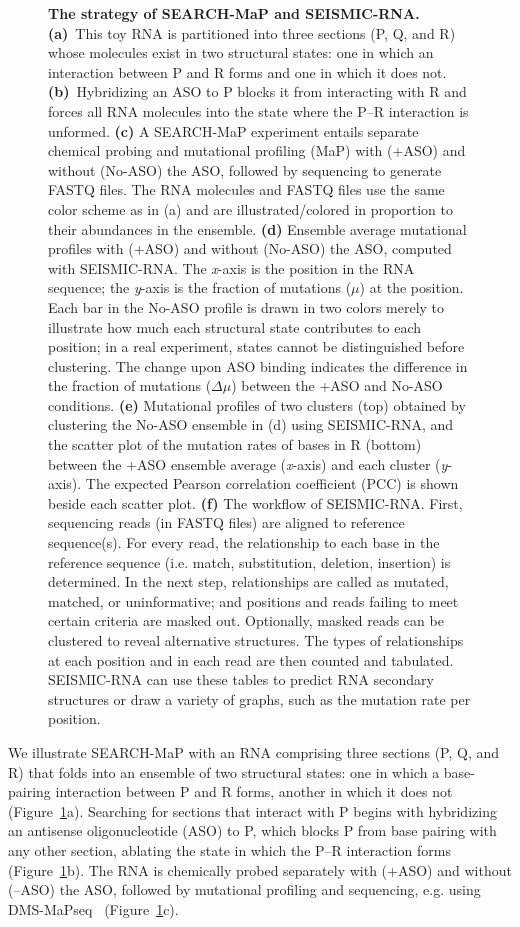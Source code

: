 \documentclass[main.tex]{subfiles}
\begin{document}
\begin{figure}[H]
	\caption{\textbf{The strategy of SEARCH-MaP and SEISMIC-RNA.} \textbf{(a)}~This toy RNA is partitioned into three sections (P, Q, and R) whose molecules exist in two structural states: one in which an interaction between P and R forms and one in which it does not. \textbf{(b)}~Hybridizing an ASO to P blocks it from interacting with R and forces all RNA molecules into the state where the P--R interaction is unformed. \textbf{(c)} A SEARCH-MaP experiment entails separate chemical probing and mutational profiling (MaP) with (+ASO) and without (No-ASO) the ASO, followed by sequencing to generate FASTQ files. The RNA molecules and FASTQ files use the same color scheme as in (a) and are illustrated/colored in proportion to their abundances in the ensemble. \textbf{(d)} Ensemble average mutational profiles with (+ASO) and without (No-ASO) the ASO, computed with SEISMIC-RNA. The \textit{x}-axis is the position in the RNA sequence; the \textit{y}-axis is the fraction of mutations ($\mu$) at the position. Each bar in the No-ASO profile is drawn in two colors merely to illustrate how much each structural state contributes to each position; in a real experiment, states cannot be distinguished before clustering. The change upon ASO binding indicates the difference in the fraction of mutations ($\Delta \mu$) between the +ASO and No-ASO conditions. \textbf{(e)} Mutational profiles of two clusters (top) obtained by clustering the No-ASO ensemble in (d) using SEISMIC-RNA, and the scatter plot of the mutation rates of bases in R (bottom) between the +ASO ensemble average (\textit{x}-axis) and each cluster (\textit{y}-axis). The expected Pearson correlation coefficient (PCC) is shown beside each scatter plot. \textbf{(f)} The workflow of SEISMIC-RNA. First, sequencing reads (in FASTQ files) are aligned to reference sequence(s). For every read, the relationship to each base in the reference sequence (i.e. match, substitution, deletion, insertion) is determined. In the next step, relationships are called as mutated, matched, or uninformative; and positions and reads failing to meet certain criteria are masked out. Optionally, masked reads can be clustered to reveal alternative structures. The types of relationships at each position and in each read are then counted and tabulated. SEISMIC-RNA can use these tables to predict RNA secondary structures or draw a variety of graphs, such as the mutation rate per position.}
	\label{strat}
\end{figure}

We illustrate SEARCH-MaP with an RNA comprising three sections (P, Q, and R) that folds into an ensemble of two structural states: one in which a base-pairing interaction between P and R forms, another in which it does not (Figure~\ref{strat}a).
Searching for sections that interact with P begins with hybridizing an antisense oligonucleotide (ASO) to P, which blocks P from base pairing with any other section, ablating the state in which the P--R interaction forms (Figure~\ref{strat}b).
The RNA is chemically probed separately with (+ASO) and without (--ASO) the ASO, followed by mutational profiling and sequencing, e.g. using DMS-MaPseq~\cite{Zubradt2016} (Figure~\ref{strat}c).
\end{document}
